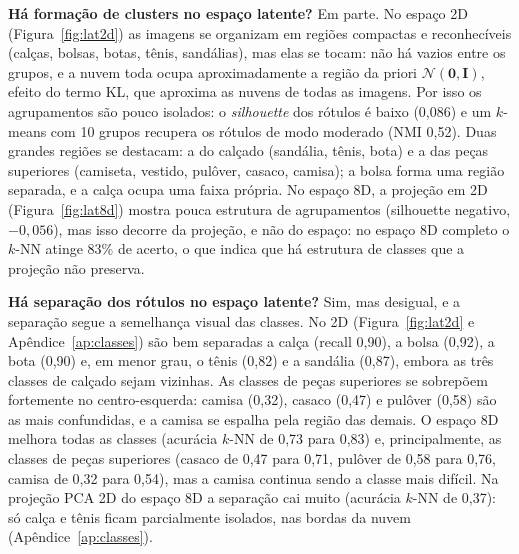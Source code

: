 \documentclass[11pt,a4paper]{article}
\begin{document}
\textbf{Há formação de clusters no espaço latente?} Em parte. No espaço 2D (Figura~\ref{fig:lat2d}) as imagens se organizam em regiões compactas e reconhecíveis (calças, bolsas, botas, tênis, sandálias), mas elas se tocam: não há vazios entre os grupos, e a nuvem toda ocupa aproximadamente a região da priori $\mathcal{N}(\mathbf{0},\mathbf{I})$, efeito do termo KL, que aproxima as nuvens de todas as imagens. Por isso os agrupamentos são pouco isolados: o \emph{silhouette} dos rótulos é baixo (0,086) e um $k$-means com 10 grupos recupera os rótulos de modo moderado (NMI 0,52). Duas grandes regiões se destacam: a do calçado (sandália, tênis, bota) e a das peças superiores (camiseta, vestido, pulôver, casaco, camisa); a bolsa forma uma região separada, e a calça ocupa uma faixa própria. No espaço 8D, a projeção em 2D (Figura~\ref{fig:lat8d}) mostra pouca estrutura de agrupamentos (silhouette negativo, $-0{,}056$), mas isso decorre da projeção, e não do espaço: no espaço 8D completo o $k$-NN atinge 83\% de acerto, o que indica que há estrutura de classes que a projeção não preserva.

\textbf{Há separação dos rótulos no espaço latente?} Sim, mas desigual, e a separação segue a semelhança visual das classes. No 2D (Figura~\ref{fig:lat2d} e Apêndice~\ref{ap:classes}) são bem separadas a calça (recall 0,90), a bolsa (0,92), a bota (0,90) e, em menor grau, o tênis (0,82) e a sandália (0,87), embora as três classes de calçado sejam vizinhas. As classes de peças superiores se sobrepõem fortemente no centro-esquerda: camisa (0,32), casaco (0,47) e pulôver (0,58) são as mais confundidas, e a camisa se espalha pela região das demais. O espaço 8D melhora todas as classes (acurácia $k$-NN de 0,73 para 0,83) e, principalmente, as classes de peças superiores (casaco de 0,47 para 0,71, pulôver de 0,58 para 0,76, camisa de 0,32 para 0,54), mas a camisa continua sendo a classe mais difícil. Na projeção PCA 2D do espaço 8D a separação cai muito (acurácia $k$-NN de 0,37): só calça e tênis ficam parcialmente isolados, nas bordas da nuvem (Apêndice~\ref{ap:classes}).
\end{document}
